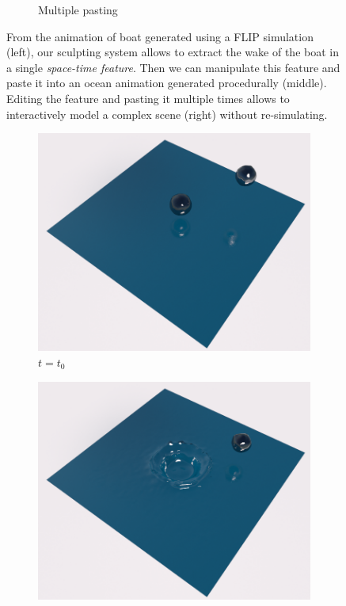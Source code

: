 \begin{figure}[th!]
\begin{subfigure}[b]{0.48\linewidth}
\caption{\label{fig:result_detail:paste_2}\scriptsize{Multiple pasting}}
    \end{subfigure}
    \caption[Fluid sculpting: Boat wake]{\label{fig:result:boatWake}
         From the animation of boat generated using a FLIP simulation (left), our sculpting system allows to extract the wake of the boat in a single \emph{space-time feature}. Then we can manipulate this feature and paste it into an ocean animation generated procedurally (middle). Editing the feature and pasting it multiple times allows to interactively model a complex scene (right) without re-simulating.
     }
\end{figure}

\begin{figure}[th!]
    \centering
    \begin{subfigure}[b]{0.3\linewidth}
    \centering
\includegraphics[width=\textwidth]{images/fluidsculpting-mig2016/results/two_drops_0.png}
\caption{\label{fig:result_trajectory:t0}$t=t_{0}$}
    \end{subfigure}
    \hspace{0.1cm}
    \begin{subfigure}[b]{0.3\linewidth}
    \centering
\includegraphics[width=\textwidth]{images/fluidsculpting-mig2016/results/two_drops_1.png}

\end{subfigure}
\end{figure}

